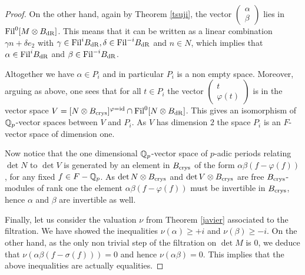 \begin{proof}
    On the other hand, again by Theorem \ref{tsuji}, the vector $\begin{pmatrix} \alpha \\
\beta
 \end{pmatrix}$ lies in $ \textnormal{Fil}^0[M \otimes B_{\mathrm{dR}}]$. This means that it can be written as a linear combination $\gamma n + \delta e_2$ with $\gamma \in \textnormal{Fil}^{i}B_{\mathrm{dR}}, \delta \in \textnormal{Fil}^{-i} B_{\mathrm{dR}}$ and $n \in N$, which implies that $\alpha \in \textnormal{Fil}^{i}B_{\mathrm{dR}}$ and  $\beta \in \textnormal{Fil}^{-i}B_{\mathrm{dR}}$.

 Altogether we have    $\alpha \in P_i$ and in particular  $P_i$ is a non empty space. Moreover, arguing as above, one sees that for all $t \in P_i$ the vector $\begin{pmatrix} t   \\
\varphi(t)
 \end{pmatrix}$ is in the vector space $V=[N \otimes B_{\textnormal{crys}}]^{\varphi=\mathrm{id}} \cap  \textnormal{Fil}^0[N \otimes B_{\mathrm{dR}}] $. This gives an isomorphism of $\mathbb{Q}_p$-vector spaces between $V$ and $P_i$. As $V$ has dimension $2$ the space $P_i$ is an $F$-vector space of dimension one.

 Now notice that  the one dimensional $\mathbb{Q}_p$-vector space of $p$-adic periods relating $\det N$ to $\det V$ is generated by an element in $B_{\textnormal{crys}}$ of the form $\alpha \beta (f-\varphi( f) )$, for any fixed $f \in F- \mathbb{Q}_p$. As $\det N\otimes B_{\textnormal{crys}}$ and $\det V\otimes B_{\textnormal{crys}}$ are free $B_{\textnormal{crys}}$-modules of rank one the element $\alpha \beta (f-\varphi( f) )$ must be invertible in $B_{\textnormal{crys}}$, hence $\alpha$ and  $\beta$ are invertible as well.

Finally, let us consider the  valuation $\nu$ from Theorem \ref{javier} associated to the filtration. We have showed the inequalities $\nu ( \alpha) \geq +i$ and  $\nu (  \beta)\geq -i$.
On the other hand, as the only non trivial step of the filtration on $\det M$ is  $0$, we deduce that $\nu ( \alpha \beta (f-\sigma( f) ))=0$ and hence $\nu ( \alpha \beta)=0$. This implies  that the above inequalities are actually equalities.
 \end{proof}


